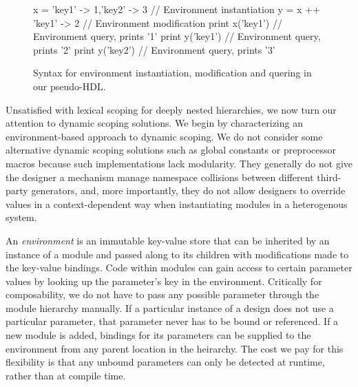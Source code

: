 \begin{figure}
\centering
\begin{phdl}
x = {'key1' -> 1,'key2' -> 3} // Environment instantiation
y = x ++ {'key1' -> 2}        // Environment modification
print x('key1')               // Environment query, prints '1'
print y('key1')               // Environment query, prints '2'
print y('key2')               // Environment query, prints '3'
\end{phdl}
\caption{Syntax for environment instantiation, modification and quering in our pseudo-HDL.}
\label{fig:env-phdl}
\end{figure}

Unsatisfied with lexical scoping for deeply nested hierarchies, we now turn our attention to dynamic scoping solutions.
We begin by characterizing an environment-based approach to dynamic scoping.
We do not consider some alternative dynamic scoping solutions such as global constants or preprocessor macros because such implementations lack modularity.
They generally do not give the designer a mechanism manage namespace collisions between different third-party generators, 
and, more importantly, they do not allow designers to override values in a context-dependent way when instantiating modules in a heterogenous system.

An \emph{environment} is an immutable key-value store that can be inherited by an instance of a module and passed along to its children
with modifications made to the key-value bindings.
Code within modules can gain access to certain parameter values by looking up the parameter's key in the environment.
Critically for composability, we do not have to pass any possible parameter through the module hierarchy manually.
If a particular instance of a design does not use a particular parameter, that parameter never has to be bound or referenced.
If a new module is added, bindings for its parameters can be supplied to the environment from any parent location in the heirarchy.
The cost we pay for this flexibility is that any unbound parameters can only be detected at runtime, rather than at compile time.

